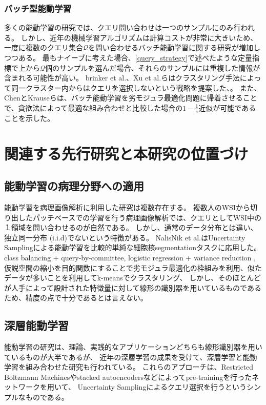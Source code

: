 \subsubsection{バッチ型能動学習}
多くの能動学習の研究では、クエリ問い合わせは一つのサンプルにのみ行われる。
しかし、近年の機械学習アルゴリズムは計算コストが非常に大きいため、一度に複数のクエリ集合$\mathcal{Q}$を問い合わせるバッチ能動学習に関する研究が増加しつつある。
最もナイーブに考えた場合、\ref{query_strategy}で述べたような定量指標で上から$\mathcal{Q}$個のサンプルを選んだ場合、それらのサンプルには重複した情報が含まれる可能性が高い。
brinker et al.、Xu et al.らはクラスタリング手法によって同一クラスター内からはクエリを選択しないという戦略を提案した\cite{brinker2003incorporating}、\cite{Xu2007}。
また、ChenとKrauseらは、バッチ能動学習を劣モジュラ最適化問題に帰着させることで、貪欲法によって最適な組み合わせと比較した場合の$1 - \frac{1}{e}$近似が可能であることを示した。
\cite{chen2013near}


\section{関連する先行研究と本研究の位置づけ}

\subsection{能動学習の病理分野への適用}
能動学習を病理画像解析に利用した研究は複数存在する。
複数人のWSIから切り出したパッチベースでの学習を行う病理画像解析では、クエリとしてWSI中の１領域を問い合わせるのが自然である。
しかし、通常のデータ分布とは違い、独立同一分布 (i.i.d)でないという特徴がある。
NalisNik et al.はUncertainty Samplingによる能動学習を比較的単純な細胞核segmentationタスクに応用した\cite{nalisnik2017interactive}。
class balancing + query-by-committee\cite{doyle2011active}, 
logistic regression + variance reduction \cite{padmanabhan2014active},
仮説空間の縮小を目的関数にすることで劣モジュラ最適化の枠組みを利用、似たデータが多いことを利用してk-meansでクラスタリング\cite{zhu2014scalable}、
しかし、そのほとんどが人手によって設計された特徴量に対して線形の識別器を用いているものであるため、精度の点で十分であるとは言えない。

\subsection{深層能動学習}
能動学習の研究は、理論、実践的なアプリケーションどちらも線形識別器を用いているものが大半であるが、
近年の深層学習の成果を受けて、深層学習と能動学習を組み合わせた研究も行われている\cite{6889457, li2016active}。
これらのアプローチは、Restricted Boltzmann Machinesやstacked autoencodersなどによってpre-trainingを行ったネットワークを用いて、
Uncertainty Samplingによるクエリ選択を行うというシンプルなものである。

